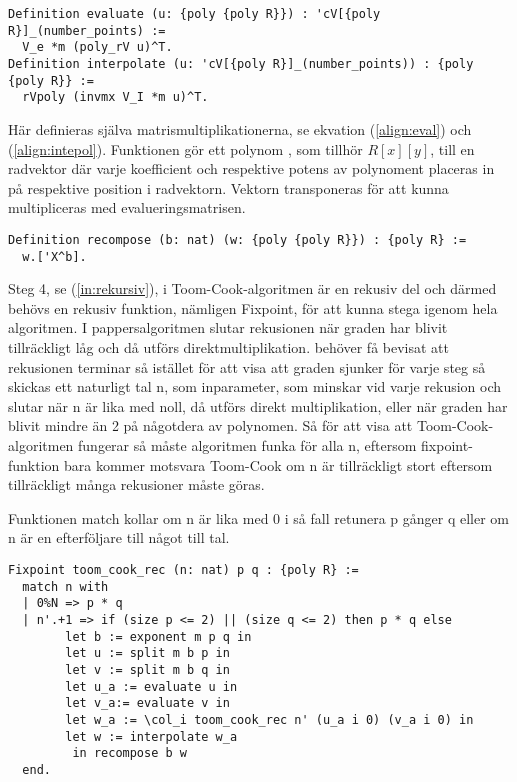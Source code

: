 \begin{lstlisting}
Definition evaluate (u: {poly {poly R}}) : 'cV[{poly R}]_(number_points) :=
  V_e *m (poly_rV u)^T.
Definition interpolate (u: 'cV[{poly R}]_(number_points)) : {poly {poly R}} :=
  rVpoly (invmx V_I *m u)^T.
\end{lstlisting}

Här definieras själva matrismultiplikationerna, se ekvation (\ref{align:eval})
och (\ref{align:intepol}). Funktionen  gör ett polynom , som
tillhör $R[x][y]$, till en radvektor där varje koefficient och respektive
potens av polynoment placeras in på respektive position i radvektorn. Vektorn
transponeras för att kunna multipliceras med evalueringsmatrisen.

\begin{lstlisting}
Definition recompose (b: nat) (w: {poly {poly R}}) : {poly R} :=
  w.['X^b].
\end{lstlisting}

Steg 4, se (\ref{in:rekursiv}), i Toom-Cook-algoritmen är en rekusiv del och
därmed behövs en rekusiv funktion, nämligen Fixpoint, för att kunna stega
igenom hela algoritmen. I pappersalgoritmen slutar rekusionen när graden har
blivit tillräckligt låg och då utförs direktmultiplikation. \coq behöver få
bevisat att rekusionen terminar så istället för att visa att graden sjunker för
varje steg så skickas ett naturligt tal n, som inparameter, som minskar vid
varje rekusion och slutar när n är lika med noll, då utförs direkt
multiplikation, eller när graden har blivit mindre än 2 på någotdera av
polynomen. Så för att visa att Toom-Cook-algoritmen fungerar så måste
algoritmen funka för alla n, eftersom fixpoint-funktion bara kommer motsvara
Toom-Cook om n är tillräckligt stort eftersom tillräckligt många rekusioner
måste göras.

Funktionen match kollar om n är lika med 0 i så fall retunera p gånger q eller
om n är en efterföljare till något till tal.

\begin{lstlisting}
Fixpoint toom_cook_rec (n: nat) p q : {poly R} :=
  match n with
  | 0%N => p * q
  | n'.+1 => if (size p <= 2) || (size q <= 2) then p * q else
        let b := exponent m p q in
        let u := split m b p in
        let v := split m b q in
        let u_a := evaluate u in
        let v_a:= evaluate v in
        let w_a := \col_i toom_cook_rec n' (u_a i 0) (v_a i 0) in
        let w := interpolate w_a
         in recompose b w
  end.
\end{lstlisting}

